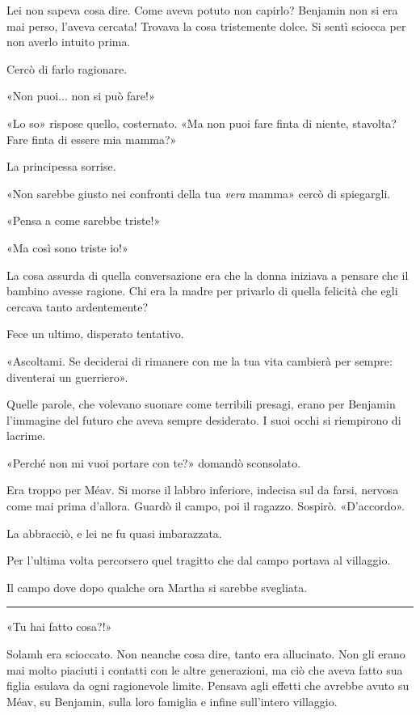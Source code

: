 \documentclass[a4paper,10pt]{memoir}
\begin{document}
Lei non sapeva cosa dire. Come aveva potuto non capirlo? Benjamin non si era mai perso, l'aveva cercata! Trovava la cosa
tristemente dolce. Si sentì sciocca per non averlo intuito prima.

Cercò di farlo ragionare.

«Non puoi... non si può fare!»

«Lo so» rispose quello, costernato. «Ma non puoi fare finta di niente, stavolta? Fare finta di essere mia mamma?»

La principessa sorrise.

«Non sarebbe giusto nei confronti della tua \emph{vera} mamma» cercò di
spiegargli.

«Pensa a come sarebbe triste!»

«Ma così sono triste io!»

La cosa assurda di quella conversazione era che la donna iniziava a pensare che il bambino avesse ragione. Chi era la
madre per privarlo di quella felicità che egli cercava tanto ardentemente?

Fece un ultimo, disperato tentativo.

«Ascoltami. Se deciderai di rimanere con me la tua vita cambierà per sempre: diventerai un guerriero».

Quelle parole, che volevano suonare come terribili presagi, erano per Benjamin l'immagine del futuro che aveva sempre
desiderato. I suoi occhi si riempirono di lacrime.

«Perché non mi vuoi portare con te?» domandò sconsolato.

Era troppo per Méav. Si morse il labbro inferiore, indecisa sul da farsi, nervosa come mai prima d'allora. Guardò il
campo, poi il ragazzo. Sospirò.
«D'accordo».

La abbracciò, e lei ne fu quasi imbarazzata.

Per l'ultima volta percorsero quel tragitto che dal campo portava al villaggio.

Il campo dove dopo qualche ora Martha si sarebbe svegliata.

\plainbreak{1}

«Tu hai fatto cosa?!»

Solamh era scioccato. Non neanche cosa dire, tanto era allucinato. Non gli erano mai molto piaciuti i contatti con le
altre generazioni, ma ciò che aveva fatto sua figlia esulava da ogni ragionevole limite. Pensava agli effetti che
avrebbe avuto su Méav, su Benjamin, sulla loro famiglia e infine sull'intero villaggio.
\end{document}
